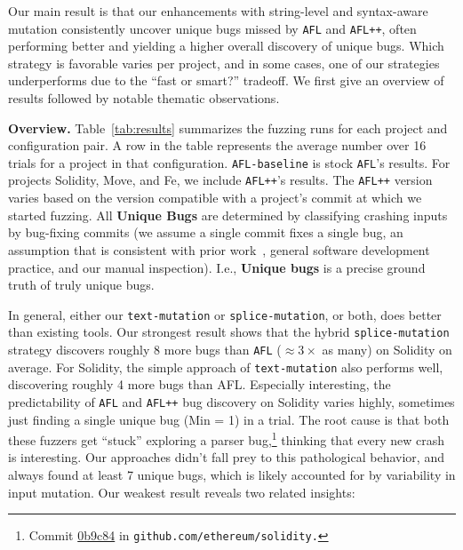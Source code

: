 Our main result is that our enhancements with string-level and syntax-aware
mutation consistently uncover unique bugs missed by \texttt{AFL} and
\texttt{AFL++}, often performing better and yielding a higher overall discovery
of unique bugs. Which strategy is favorable varies per project, and in some
cases, one of our strategies underperforms due to the ``fast or smart?''
tradeoff. We first give an overview of results followed by notable
thematic observations.

\noindent \textbf{Overview.} Table~\ref{tab:results} summarizes the fuzzing
runs for each project and configuration pair. A row in the table represents the
average number over 16 trials for a project in that configuration.
\texttt{AFL-baseline} is stock \texttt{AFL}'s results. For projects Solidity,
Move, and Fe, we include \texttt{AFL++}'s results. The \texttt{AFL++} version
varies based on the version compatible with a project's commit at which we
started fuzzing. All \textbf{Unique Bugs} are determined by classifying crashing
inputs by bug-fixing commits (we assume a single commit fixes a single bug, an
assumption that is consistent with prior
work~\cite{semantic-crash-bucketing,Taming}, general software development
practice, and our manual inspection). I.e., \textbf{Unique bugs} is a precise
ground truth of truly unique bugs.

\begin{sloppypar}
In general, either our \texttt{text-mutation} or \texttt{splice-mutation}, or
both, does better than existing tools. Our strongest result shows that the
hybrid \texttt{splice-mutation} strategy discovers roughly 8 more bugs than
\texttt{AFL} ($\approx3\times$ as many) on Solidity on average. For Solidity,
the simple approach of \texttt{text-mutation} also performs well, discovering
roughly 4 more bugs than AFL. Especially interesting, the predictability of
\texttt{AFL} and \texttt{AFL++} bug discovery on Solidity varies highly,
sometimes just finding a single unique bug (Min = 1) in a trial. The root cause
is that both these fuzzers get ``stuck'' exploring a parser
bug,\footnote{Commit
\href{https://github.com/ethereum/solidity/commit/0b9c842656c644c209280e5f570f94dee77a1606}{0b9c84}
in \texttt{github.com/ethereum/solidity.}} thinking that every new crash is
interesting. Our approaches didn't fall prey to this pathological behavior, and
always found at least 7 unique bugs, which is likely accounted for by
variability in input mutation. Our weakest result reveals two related
insights:
\end{sloppypar}

